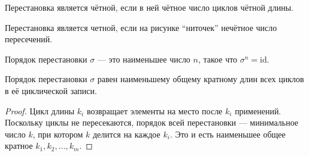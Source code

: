 \begin{corollary}
    Перестановка является чётной, если в ней чётное число циклов чётной длины.
\end{corollary}
\begin{proposition}
    Перестановка является четной, если на рисунке ``ниточек'' нечётное число пересечений.
\end{proposition}


\begin{definition}
    Порядок перестановки $\sigma$ --- это наименьшее число $n$, такое что \(
        \sigma^n = \text{id}.
    \)
\end{definition}


\begin{theorem}
    Порядок перестановки $\sigma$ равен наименьшему общему кратному длин всех циклов в её циклической записи.
\end{theorem}
\begin{proof}
    Цикл длины $k_i$ возвращает элементы на место после $k_i$ применений. Поскольку циклы не пересекаются, порядок всей перестановки — минимальное число $k$, при котором $k$ делится на каждое $k_i$.  
    Это и есть наименьшее общее кратное $k_1, k_2, \dots, k_m$.
\end{proof}
